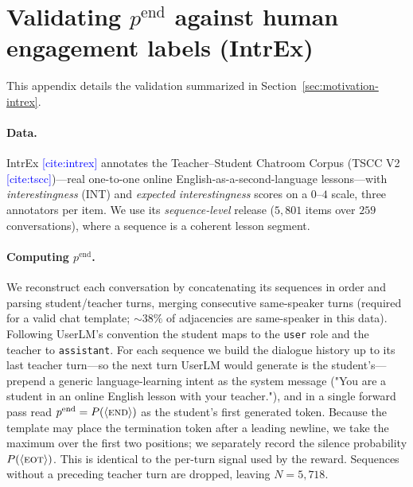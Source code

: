 \documentclass[11pt]{article}
\newcommand{\cit}[1]{\textcolor{blue}{[\textsf{cite:#1}]}}
\begin{document}
\section{Validating $p^{\text{end}}$ against human engagement labels (IntrEx)}
\label{app:intrex}

This appendix details the validation summarized in Section~\ref{sec:motivation-intrex}.

\paragraph{Data.} IntrEx \cit{intrex} annotates the Teacher--Student Chatroom
Corpus (TSCC V2 \cit{tscc})---real one-to-one online English-as-a-second-language
lessons---with \emph{interestingness} (INT) and \emph{expected interestingness}
scores on a $0$--$4$ scale, three annotators per item. We use its
\emph{sequence-level} release ($5{,}801$ items over $259$ conversations), where a
sequence is a coherent lesson segment.

\paragraph{Computing $p^{\text{end}}$.} We reconstruct each conversation by
concatenating its sequences in order and parsing student/teacher turns, merging
consecutive same-speaker turns (required for a valid chat template; ${\sim}38\%$ of
adjacencies are same-speaker in this data). Following UserLM's convention the
student maps to the \texttt{user} role and the teacher to \texttt{assistant}. For
each sequence we build the dialogue history up to its last teacher turn---so the
next turn UserLM would generate is the student's---prepend a generic
language-learning intent as the system message ("You are a student in an online English lesson with your teacher."), 
and in a single forward pass read $p^{\text{end}}=P(\langle\textsc{end}
\rangle)$ as the student's first generated token. Because the template may place
the termination token after a leading newline, we take the maximum over the first
two positions; we separately record the silence probability $P(\langle\textsc{eot}
\rangle)$. This is identical to the per-turn signal used by the reward. Sequences
without a preceding teacher turn are dropped, leaving $N{=}5{,}718$.

\end{document}
